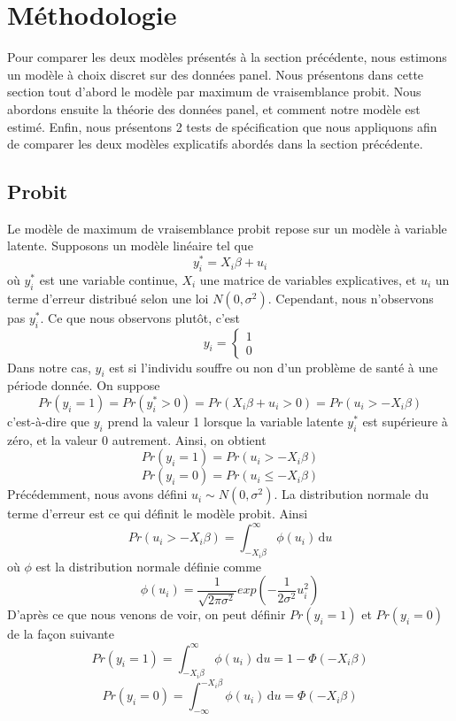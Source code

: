 \documentclass[a4paper, oneside, titlepage]{article}
\begin{document}
\section{Méthodologie}
Pour comparer les deux modèles présentés à la section précédente, nous estimons un modèle à choix discret sur des données panel. Nous présentons dans cette section tout d'abord le modèle par maximum de vraisemblance probit. Nous abordons ensuite la théorie des données panel, et comment notre modèle est estimé. Enfin, nous présentons 2 tests de spécification que nous appliquons afin de comparer les deux modèles explicatifs abordés dans la section précédente.

\subsection{Probit}
Le modèle de maximum de vraisemblance probit repose sur un modèle à variable latente. Supposons un modèle linéaire tel que
\[y_i^*=X_i\beta+u_i\]
où $y_i^*$ est une variable continue, $X_i$ une matrice de variables explicatives, et $u_i$ un terme d'erreur distribué selon une loi $N(0, \sigma^2)$. Cependant, nous n'observons pas $y_i^*$. Ce que nous observons plutôt, c'est 
\begin{equation}
  y_i=\left\{
    \begin{split}
    1 \\ 
    0
    \end{split}
  \right.
\end{equation}
Dans notre cas, $y_i$ est si l'individu souffre ou non d'un problème de santé à une période donnée. On suppose 
\[Pr(y_i=1)=Pr(y_i^*>0)=Pr(X_i\beta+u_i>0)=Pr(u_i>-X_i\beta)\]
c'est-à-dire que $y_i$ prend la valeur 1 lorsque la variable latente $y_i^*$ est supérieure à zéro, et la valeur 0 autrement. Ainsi, on obtient
\[Pr(y_i=1)=Pr(u_i>-X_i\beta)\]
\[Pr(y_i=0)=Pr(u_i\leq -X_i\beta)\]
Précédemment, nous avons défini $u_i \sim  N(0, \sigma^2)$.  La distribution normale du terme d'erreur est ce qui définit le modèle probit. Ainsi
\[Pr(u_i>-X_i\beta)=\int_{-X_i\beta}^\infty \phi(u_i) \, \mathrm du\]
où $\phi$ est la distribution normale définie comme
\[\phi(u_i)=\frac{1}{\sqrt{2\pi\sigma^2}}exp(-\frac{1}{2\sigma^2}u_i^2)\]
D'après ce que nous venons de voir, on peut définir $Pr(y_i=1)$ et $Pr(y_i=0)$ de la façon suivante
\[Pr(y_i=1)=\int_{-X_i\beta}^\infty \phi(u_i) \, \mathrm du=1-\Phi(-X_i\beta)\]
\[Pr(y_i=0)=\int_{-\infty}^{-X_i\beta} \phi(u_i) \, \mathrm du=\Phi(-X_i\beta)\]
\end{document}
